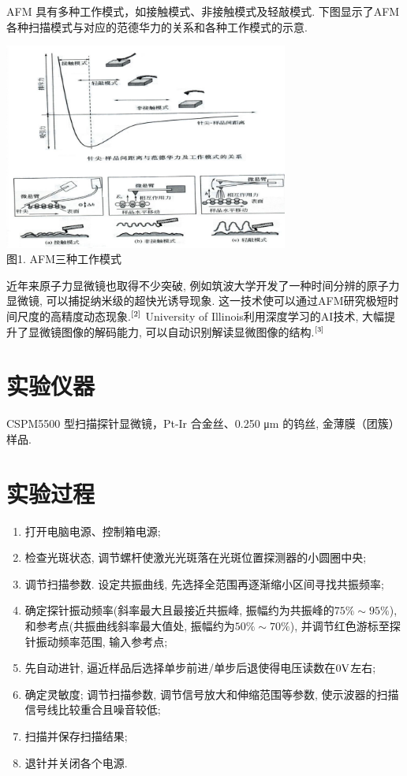 \documentclass[UTF8]{ctexart}
\begin{document}
AFM 具有多种工作模式，如接触模式、非接触模式及轻敲模式. 下图显示了AFM各种扫描模式与对应的范德华力的关系和各种工作模式的示意.\\
\begin{minipage}[!ht]{1\linewidth}
    \centering
    \includegraphics[width=0.7\textwidth]{1.png}\\
    {\small{
        图1. AFM三种工作模式
    }}
    \vspace{10pt}
\end{minipage}\par
近年来原子力显微镜也取得不少突破, 例如筑波大学开发了一种时间分辨的原子力显微镜, 可以捕捉纳米级的超快光诱导现象. 这一技术使可以通过AFM研究极短时间尺度的高精度动态现象.$\rm ^{[2]}$ University of Illinois利用深度学习的AI技术, 大幅提升了显微镜图像的解码能力, 可以自动识别解读显微图像的结构.$\rm ^{[3]}$
\section{实验仪器}
CSPM5500 型扫描探针显微镜，Pt-Ir 合金丝、0.250 μm 的钨丝, 金薄膜（团簇）样品.
\section{实验过程}
\begin{enumerate}
    \item 打开电脑电源、控制箱电源;
    \item 检查光斑状态, 调节螺杆使激光光斑落在光斑位置探测器的小圆圈中央;
    \item 调节扫描参数. 设定共振曲线, 先选择全范围再逐渐缩小区间寻找共振频率;
    \item 确定探针振动频率(斜率最大且最接近共振峰, 振幅约为共振峰的$75\%\sim 95\%$),和参考点(共振曲线斜率最大值处, 振幅约为$50\%\sim70\%$), 并调节红色游标至探针振动频率范围, 输入参考点;
    \item 先自动进针, 逼近样品后选择单步前进/单步后退使得电压读数在$0\rm V$左右;
    \item 确定灵敏度; 调节扫描参数, 调节信号放大和伸缩范围等参数, 使示波器的扫描信号线比较重合且噪音较低;
    \item 扫描并保存扫描结果;
    \item 退针并关闭各个电源.
\end{enumerate}
\end{document}
